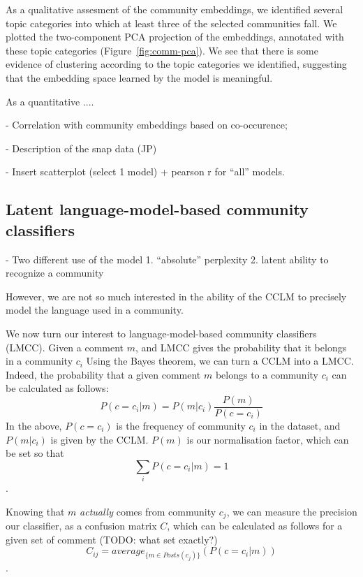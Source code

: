 \documentclass[11pt,a4paper]{article}
\begin{document}
As a qualitative assesment of the community embeddings, 
we identified several topic categories into which at least three
of the selected communities fall. 
We plotted the two-component PCA projection of the embeddings,
annotated with these topic categories (Figure~\ref{fig:comm-pca}).
We see that there is some evidence of clustering according to
the topic categories we identified,
suggesting that the embedding space learned by the model is meaningful.

\begin{figure*}
\caption{Community embedding PCA of the best LSTM (left, $c=1$) and transformer (right, $c=3$) models.}
\label{fig:comm-pca}
\end{figure*}

As a quantitative ....

- Correlation with community embeddings based on co-occurence;

- Description of the snap data (JP)

- Insert scatterplot (select 1 model)
  + pearson r for ``all'' models.


\subsection{Latent language-model-based community classifiers}

- Two different use of the model
1. ``absolute'' perplexity
2. latent ability to recognize a community


However, we are not so much interested in the ability of the CCLM to
precisely model the language used in a community.

We now turn our interest to language-model-based community classifiers
(LMCC). Given a comment $m$, and LMCC gives the probability that it
belongs in a community $c_i$ Using the Bayes theorem, we can turn a
CCLM into a LMCC. Indeed, the probability that a given comment $m$
belongs to a community $c_i$ can be calculated as follows:
\[P(c=c_i | m) = P(m | c_i)\frac {P(m)} {P(c=c_i)}\]
In the above,
$P(c=c_i)$ is the frequency of community $c_i$ in the dataset, and
$P(m | c_i)$ is given by the CCLM. $P(m)$ is our normalisation factor, which can be set so that
\[\sum_i P(c=c_i | m) = 1\].

Knowing that $m$ \emph{actually} comes from community $c_j$, we can
measure the precision our classifier, as a confusion matrix $C$,
which can be calculated as follows for a given set of comment (TODO: what set exactly?)
\[C_{ij} = average_{\{m ∈ Posts(c_j)\}}(P(c=c_i | m))\].
\end{document}
